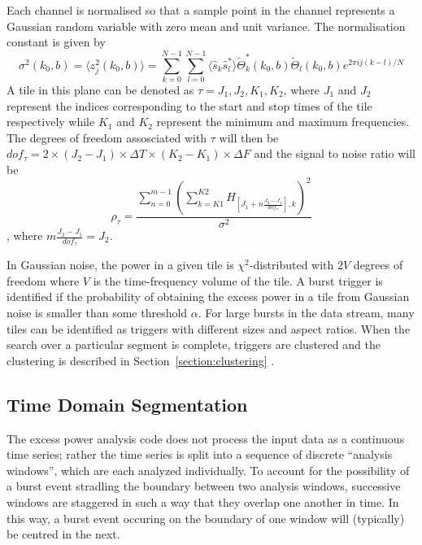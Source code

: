 Each channel is normalised so that a sample point in the channel represents
a Gaussian random variable with zero mean and unit variance. The normalisation constant is given
by 
\begin{equation}
\sigma^2(k_0,  b) = \langle z_j^2(k_0, b) \rangle = \sum_{k=0}^{N-1}\sum_{l=0}^{N-1}\langle \hat{s}_k \hat{s}_l^\ast \rangle \tilde{\Theta}_k^\ast(k_0,  b) \tilde{\Theta}_l(k_0,  b) e^{2 \pi ij(k-l)/N}
\end{equation}
A tile in this plane can be denoted as $\tau ={J_1, J_2, K_1, K_2}$,  where
$J_1$ and $J_2$ represent the indices corresponding to the start and 
stop times of the tile respectively while $K_1$ and $K_2$ represent the
minimum and maximum frequencies.  The degrees of freedom assosciated with
$\tau$ will then be $dof_{\tau} = 2 \times (J_2 - J_1) \times \Delta T \times (K_2 - K_1) \times \Delta F $ and the signal to noise ratio will be 
\begin{equation}
\rho_{\tau} = \frac{\sum_{n=0}^{m-1}(\sum_{k=K1}^{K2}H_{[J_1 + n\frac{J_2-J_1}{dof_{\tau}}],k})^2}{\sigma ^2}
\end{equation}
,  where $m\frac{J_2-J_1}{dof_\tau} = J_2$.


In Gaussian noise,  the power in a given tile is $\chi^2$-distributed
with $2 V$ degrees of freedom where $V$ is the time-frequency volume
of the tile.    A burst trigger is identified if the probability of
obtaining the excess power in a tile from Gaussian noise is smaller
than some threshold $\alpha$.   For large bursts in the data stream,
many tiles can be identified as triggers with different sizes and
aspect ratios.   When the search over a particular segment is
complete,   triggers are clustered and the clustering is described in 
Section~\ref{section:clustering} .


\subsection{Time Domain Segmentation}
The excess power analysis code does not process the input data as a
continuous time series;  rather the time series is split into a sequence of
discrete ``analysis windows'', which are each analyzed individually.  To
account for the possibility of a burst event stradling the boundary between
two analysis windows, successive windows are staggered in such a way that
they overlap one another in time.  In this way, a burst event occuring on
the boundary of one window will (typically) be centred in the next.

